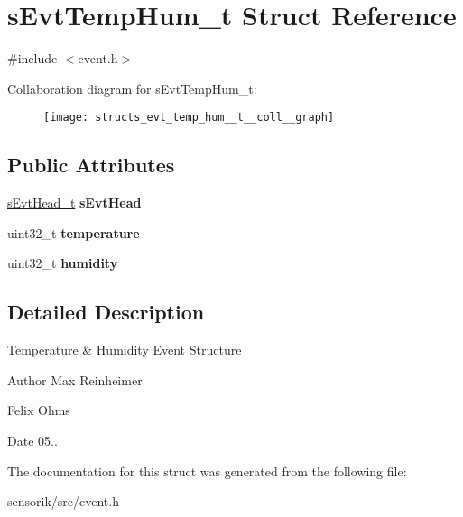 \hypertarget{structs_evt_temp_hum__t}{}\section{s\+Evt\+Temp\+Hum\+\_\+t Struct Reference}
\label{structs_evt_temp_hum__t}


{\ttfamily \#include $<$event.\+h$>$}



Collaboration diagram for s\+Evt\+Temp\+Hum\+\_\+t\+:\nopagebreak
\begin{figure}[H]
\begin{center}
\leavevmode
\texttt{[image: structs\_evt\_temp\_hum\_\_t\_\_coll\_\_graph]}
\end{center}
\end{figure}
\subsection*{Public Attributes}
\begin{DoxyCompactItemize}
\item 
\mbox{\label{structs_evt_temp_hum__t_abbc5be7ea2839fa2186f08020d0e44f8}} 
\mbox{\hyperlink{structs_evt_head__t}{s\+Evt\+Head\+\_\+t}} {\bfseries s\+Evt\+Head}
\item 
\mbox{\label{structs_evt_temp_hum__t_aa5ed31963edc2758a78fad332d96d8e0}} 
uint32\+\_\+t {\bfseries temperature}
\item 
\mbox{\label{structs_evt_temp_hum__t_aa7b5159cc05e86ad82a890d473c324e1}} 
uint32\+\_\+t {\bfseries humidity}
\end{DoxyCompactItemize}


\subsection{Detailed Description}
Temperature \& Humidity Event Structure

\begin{DoxyAuthor}{Author}
Max Reinheimer 

Felix Ohms 
\end{DoxyAuthor}
\begin{DoxyDate}{Date}
05.. 
\end{DoxyDate}


The documentation for this struct was generated from the following file\+:\begin{DoxyCompactItemize}
\item 
sensorik/src/event.\+h\end{DoxyCompactItemize}
